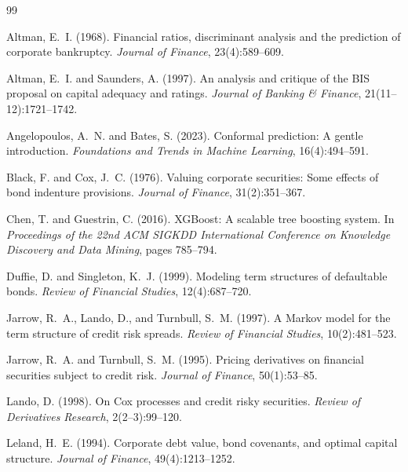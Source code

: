 \documentclass[12pt, a4paper]{article}
\theoremstyle{definition}
\begin{document}
\begin{thebibliography}{99}
\raggedright

Altman, E.~I. (1968).
Financial ratios, discriminant analysis and the prediction of corporate bankruptcy.
\textit{Journal of Finance}, 23(4):589--609.

Altman, E.~I. and Saunders, A. (1997).
An analysis and critique of the BIS proposal on capital adequacy and ratings.
\textit{Journal of Banking \& Finance}, 21(11--12):1721--1742.

Angelopoulos, A.~N. and Bates, S. (2023).
Conformal prediction: A gentle introduction.
\textit{Foundations and Trends in Machine Learning}, 16(4):494--591.

Black, F. and Cox, J.~C. (1976).
Valuing corporate securities: Some effects of bond indenture provisions.
\textit{Journal of Finance}, 31(2):351--367.

Chen, T. and Guestrin, C. (2016).
{XGBoost}: A scalable tree boosting system.
In \textit{Proceedings of the 22nd ACM SIGKDD International Conference on Knowledge Discovery and Data Mining}, pages 785--794.

Duffie, D. and Singleton, K.~J. (1999).
Modeling term structures of defaultable bonds.
\textit{Review of Financial Studies}, 12(4):687--720.

Jarrow, R.~A., Lando, D., and Turnbull, S.~M. (1997).
A Markov model for the term structure of credit risk spreads.
\textit{Review of Financial Studies}, 10(2):481--523.

Jarrow, R.~A. and Turnbull, S.~M. (1995).
Pricing derivatives on financial securities subject to credit risk.
\textit{Journal of Finance}, 50(1):53--85.

Lando, D. (1998).
On Cox processes and credit risky securities.
\textit{Review of Derivatives Research}, 2(2--3):99--120.

Leland, H.~E. (1994).
Corporate debt value, bond covenants, and optimal capital structure.
\textit{Journal of Finance}, 49(4):1213--1252.


\end{thebibliography}
\end{document}
